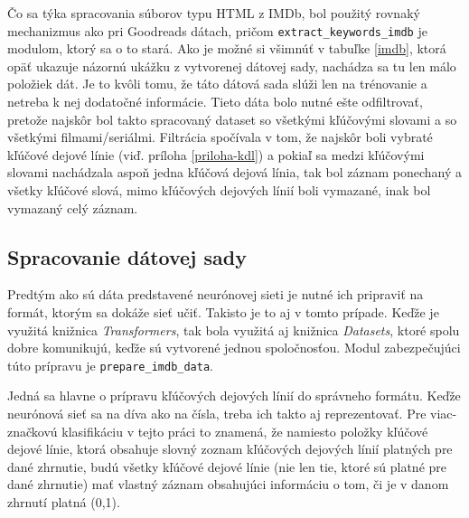 Čo sa týka spracovania súborov typu HTML z IMDb, bol použitý rovnaký mechanizmus ako pri Goodreads dátach, pričom {\tt extract\_keywords\_imdb} je modulom, ktorý sa o to stará. Ako je možné si všimnúť v tabuľke \ref{imdb}, ktorá opäť ukazuje názornú ukážku z vytvorenej dátovej sady, nachádza sa tu len málo položiek dát. Je to kvôli tomu, že táto dátová sada slúži len na trénovanie a netreba k nej dodatočné informácie. Tieto dáta bolo nutné ešte odfiltrovať, pretože najskôr bol takto spracovaný dataset so všetkými kľúčovými slovami a so všetkými filmami/seriálmi. Filtrácia spočívala v tom, že najskôr boli vybraté kľúčové dejové línie (viď. príloha \ref{priloha-kdl}) a pokiaľ sa medzi kľúčovými slovami nachádzala aspoň jedna kľúčová dejová línia, tak bol záznam ponechaný a všetky kľúčové slová, mimo kľúčových dejových línií boli vymazané, inak bol vymazaný celý záznam.   

\subsection*{Spracovanie dátovej sady}

Predtým ako sú dáta predstavené neurónovej sieti je nutné ich pripraviť na formát, ktorým sa dokáže sieť učiť. Takisto je to aj v tomto prípade. Keďže je využitá knižnica \textit{Transformers}, tak bola využitá aj knižnica \textit{Datasets}, ktoré spolu dobre komunikujú, keďže sú vytvorené jednou spoločnosťou. Modul zabezpečujúci túto prípravu je {\tt prepare\_imdb\_data}. 

Jedná sa hlavne o prípravu kľúčových dejových línií do správneho formátu. Keďže neurónová sieť sa na díva ako na čísla, treba ich takto aj reprezentovať. Pre viac-značkovú klasifikáciu v tejto práci to znamená, že namiesto položky kľúčové dejové línie, ktorá obsahuje slovný zoznam kľúčových dejových línií platných pre dané zhrnutie, budú všetky kľúčové dejové línie (nie len tie, ktoré sú platné pre dané zhrnutie) mať vlastný záznam obsahujúci informáciu o tom, či je v danom zhrnutí platná (0,1). 

